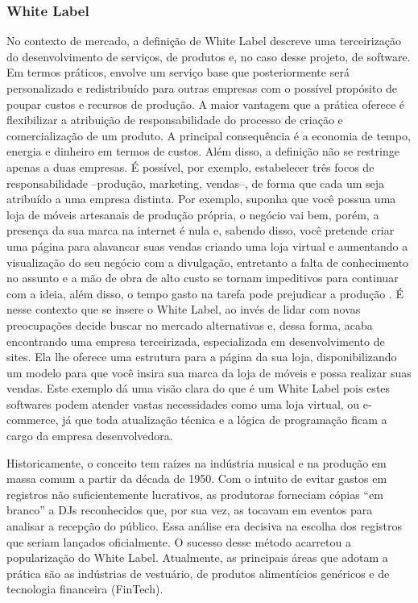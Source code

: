 \documentclass[12pt,twoside,english,brazilian]{article}
\begin{document}
\subsubsection{White Label}
No contexto de mercado, a definição de White Label descreve uma terceirização do desenvolvimento de serviços, de produtos e, no caso desse projeto, de software. Em termos práticos, envolve um serviço base que posteriormente será personalizado e redistribuído para outras empresas com o possível propósito de poupar custos e recursos de produção. A maior vantagem que a prática oferece é flexibilizar a atribuição de responsabilidade do processo de criação e comercialização de um produto. A principal consequência é a economia de tempo, energia e dinheiro em termos de custos. Além disso, a definição não se restringe apenas a duas empresas. É possível, por exemplo, estabelecer três focos de responsabilidade –produção, marketing, vendas–, de forma que cada um seja atribuído a uma empresa distinta. Por exemplo, suponha que você possua uma loja de móveis artesanais de produção própria, o negócio vai bem, porém, a presença da sua marca na internet é nula e, sabendo disso, você pretende criar uma página para alavancar suas vendas criando uma loja virtual e aumentando a visualização do seu negócio com a divulgação, entretanto a falta de conhecimento no assunto e a mão de obra de alto custo se tornam impeditivos para continuar com a ideia, além disso, o tempo gasto na tarefa pode prejudicar a produção . É nesse contexto que se insere o White Label, ao invés de lidar com novas preocupações decide buscar no mercado alternativas e, dessa forma, acaba encontrando uma empresa terceirizada, especializada em desenvolvimento de sites. Ela lhe oferece uma estrutura para a página da sua loja, disponibilizando um modelo para que você insira sua marca da loja de móveis e possa realizar suas vendas. Este exemplo dá uma visão clara do que é um White Label pois estes softwares podem atender vastas necessidades como uma loja virtual, ou e-commerce, já que toda atualização técnica e a lógica de programação ficam a cargo da empresa desenvolvedora.

Historicamente, o conceito tem raízes na indústria musical e na produção em massa comum a partir da década de 1950. Com o intuito de evitar gastos em registros não suficientemente lucrativos, as produtoras forneciam cópias “em branco” a DJs reconhecidos que, por sua vez, as tocavam em eventos para analisar a recepção do público. Essa análise era decisiva na escolha dos registros que seriam lançados oficialmente. O sucesso desse método acarretou a popularização do White Label. Atualmente, as principais áreas que adotam a prática são as indústrias de vestuário, de produtos alimentícios genéricos e de tecnologia financeira (FinTech).
\end{document}
